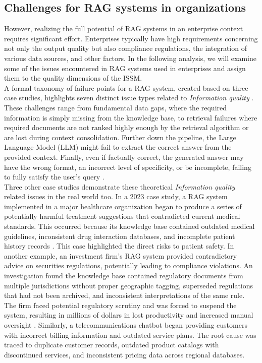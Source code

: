 \documentclass[
	english,
	ruledheaders=section,%
	class=report,%
	thesis={type=bachelor},%
	accentcolor=1b,%
	custommargins=true,%
	marginpar=false,%
	parskip=half-,%
	fontsize=11pt,%
	DIV=14,
]{tudapub}
\begin{document}
\subsection{Challenges for RAG systems in organizations}
However, realizing the full potential of RAG systems in an enterprise context requires significant effort. Enterprises typically have high requirements concerning not only the output quality but also compliance regulations, the integration of various data sources, and other factors. In the following analysis, we will examine some of the issues encountered in RAG systems used in enterprises and assign them to the quality dimensions of the ISSM. \\
A formal taxonomy of failure points for a RAG system, created based on three case studies, highlights seven distinct issue types related to \textit{Information quality} \parencite{Barnett_Kurniawan_Thudumu_Brannelly_Abdelrazek_2024}. These challenges range from fundamental data gaps, where the required information is simply missing from the knowledge base, to retrieval failures where required documents are not ranked highly enough by the retrieval algorithm or are lost during context consolidation. Further down the pipeline, the Large Language Model (LLM) might fail to extract the correct answer from the provided context. Finally, even if factually correct, the generated answer may have the wrong format, an incorrect level of specificity, or be incomplete, failing to fully satisfy the user's query \parencite{Barnett_Kurniawan_Thudumu_Brannelly_Abdelrazek_2024}.\\
Three other case studies demonstrate these theoretical \textit{Information quality} related issues in the real world too. In a 2023 case study, a RAG system implemented in a major healthcare organization began to produce a series of potentially harmful treatment suggestions that contradicted current medical standards. This occurred because its knowledge base contained outdated medical guidelines, inconsistent drug interaction databases, and incomplete patient history records \parencite{NStarX_Inc._2025}. This case highlighted the direct risks to patient safety. In another example, an investment firm's RAG system provided contradictory advice on securities regulations, potentially leading to compliance violations. An investigation found the knowledge base contained regulatory documents from multiple jurisdictions without proper geographic tagging, superseded regulations that had not been archived, and inconsistent interpretations of the same rule. The firm faced potential regulatory scrutiny and was forced to suspend the system, resulting in millions of dollars in lost productivity and increased manual oversight \parencite{NStarX_Inc._2025}. Similarly, a telecommunications chatbot began providing customers with incorrect billing information and outdated service plans. The root cause was traced to duplicate customer records, outdated product catalogs with discontinued services, and inconsistent pricing data across regional databases. \parencite{NStarX_Inc._2025}\\
\end{document}
